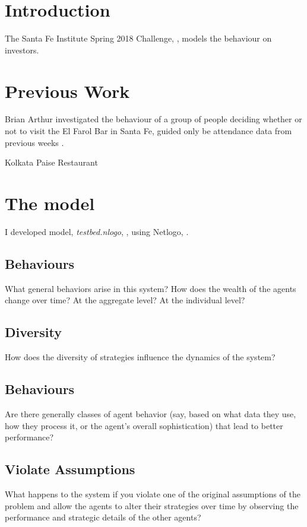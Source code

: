 \documentclass[]{article}
\title{}
\author{}
\begin{document}
\maketitle

\begin{abstract}

\end{abstract}

\section{Introduction}
The Santa Fe Institute Spring 2018 Challenge, \cite{Challenge:2018}, models the behaviour on investors.
\section{Previous Work}


Brian Arthur \cite{Arthur:1992} investigated the behaviour of a group of people deciding whether or not to visit the El Farol Bar \cite{ElFarol:2010} in Santa Fe, guided only be attendance data from previous weeks . 


Kolkata Paise Restaurant \cite{Chakrabarti:2007}
\cite{Chakrabarti:2009}
\section{The model}
I developed model, \emph{testbed.nlogo}, \cite{Github:2018}, using Netlogo, \cite{Wilensky:1999}.
\subsection{Behaviours}What general behaviors arise in this system?  How does the wealth of the agents change over time? At the aggregate level? At the individual level?
\subsection{Diversity}How does the diversity of strategies influence the dynamics of the system?
\subsection{Behaviours}Are there generally classes of agent behavior (say, based on what data they use, how they process it, or the agent's overall sophistication) that lead to better performance?
\subsection{Violate Assumptions}What happens to the system if you violate one of the original assumptions of the problem and allow the agents to alter their strategies over time by observing the performance and strategic details of the other agents?
\end{document}
